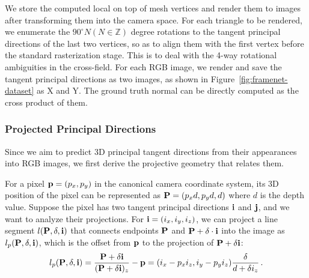 We store the computed local \cframe{} on top of mesh vertices and render them to images after transforming them into the camera space. For each triangle to be rendered, we enumerate the $90^{\circ}N (N\in \mathbb{Z})$ degree rotations to the tangent principal directions of the last two vertices, so as to align them with the first vertex before the standard rasterization stage. This is to deal with the 4-way rotational ambiguities in the cross-field. For each RGB image, we render and save the tangent principal directions as two images, as shown in Figure~\ref{fig:framenet-dataset} as X and Y. The ground truth normal can be directly computed as the cross product of them.

\subsubsection{Projected Principal Directions}
\label{sec:framenet-project}
Since we aim to predict 3D principal tangent directions from their appearances into RGB images, we first derive the projective geometry that relates them.


 For a pixel $\mathbf{p}=(p_x,p_y)$ in the canonical camera coordinate system, its 3D position of the pixel can be represented as $\mathbf{P}=(p_xd, p_yd, d)$ where $d$ is the depth value. Suppose the pixel has two tangent principal directions $\mathbf{i}$ and $\mathbf{j}$, and we want to analyze their projections. For $\mathbf{i}=(i_x,i_y,i_z)$, we can project a line segment $l(\mathbf{P},\delta,\mathbf{i})$ that connects endpoints $\mathbf{P}$ and $\mathbf{P}+\delta \cdot \mathbf{i}$ into the image as $l_p(\textbf{P},\delta,\mathbf{i})$, which is the offset from $\mathbf{p}$ to the projection of $\mathbf{P}+\delta \mathbf{i}$:
\begin{equation}
    l_p(\textbf{P},\delta,\textbf{i}) = \frac{\textbf{P}+\delta \textbf{i}}{(\textbf{P}+\delta \textbf{i})_z}-\mathbf{p}=(i_x - p_x i_z, i_y - p_y i_z)\frac{\delta}{d+\delta i_z}\,.
\end{equation}

